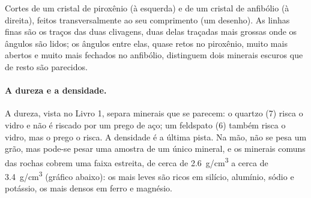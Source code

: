 \begin{omfigure}

{\small Cortes de um cristal de piroxênio (à esquerda) e de um cristal de
anfibólio (à direita), feitos transversalmente ao seu comprimento (um
desenho). As linhas finas são os traços das duas clivagens, duas delas
traçadas mais grossas onde os ângulos são lidos; os ângulos entre elas,
quase retos no piroxênio, muito mais abertos e muito mais fechados no anfibólio, distinguem dois
minerais escuros que de resto são parecidos.}
\end{omfigure}

\paragraph{A dureza e a densidade.} A dureza, vista no Livro 1, separa
minerais que se parecem: o quartzo (7) risca o vidro e não é riscado por um
prego de aço; um feldspato (6) também risca o vidro, mas o prego o risca. A
densidade é a última pista. Na mão, não se pesa um grão, mas pode-se pesar
uma amostra de um único mineral, e os minerais comuns das rochas cobrem uma
faixa estreita, de cerca de \qty{2.6}{g/cm^3} a cerca de \qty{3.4}{g/cm^3}
(gráfico abaixo): os mais leves são ricos em silício, alumínio, sódio e
potássio, os mais densos em ferro e magnésio.

